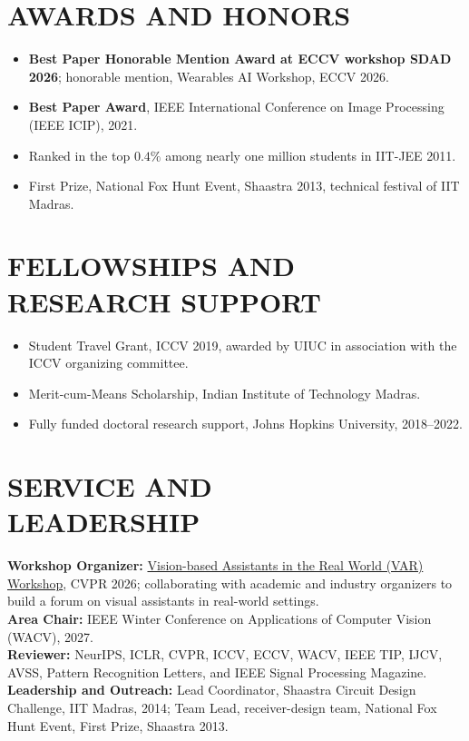 \documentclass[margin,11pt]{resume}
\begin{document}
\newpage
\section{\footnotesize {\large A}WARDS {\large A}ND {\large H}ONORS}
\begin{itemize}[leftmargin=*,itemsep=1pt,topsep=2pt]
    \item \textbf{Best Paper Honorable Mention Award at ECCV workshop SDAD 2026}; honorable mention, Wearables AI Workshop, ECCV 2026.
    \item \textbf{Best Paper Award}, IEEE International Conference on Image Processing (IEEE ICIP), 2021.
    \item Ranked in the top $0.4\%$ among nearly one million students in IIT-JEE 2011.
    \item First Prize, National Fox Hunt Event, Shaastra 2013, technical festival of IIT Madras.
\end{itemize}

\vspace{-0.8em}
\section{\footnotesize {\large F}ELLOWSHIPS {\large A}ND\\ {\large R}ESEARCH {\large S}UPPORT}
\begin{itemize}[leftmargin=*,itemsep=1pt,topsep=2pt]
    \item Student Travel Grant, ICCV 2019, awarded by UIUC in association with the ICCV organizing committee.
    \item Merit-cum-Means Scholarship, Indian Institute of Technology Madras.
    \item Fully funded doctoral research support, Johns Hopkins University, 2018--2022.
\end{itemize}

\vspace{-0.8em}
\section{\footnotesize {\large S}ERVICE {\large A}ND\\ {\large L}EADERSHIP}
\textbf{Workshop Organizer:} \href{https://varworkshop.github.io/organizers/}{Vision-based Assistants in the Real World (VAR) Workshop}, CVPR 2026; collaborating with academic and industry organizers to build a forum on visual assistants in real-world settings.\\
\textbf{Area Chair:} IEEE Winter Conference on Applications of Computer Vision (WACV), 2027.\\
\textbf{Reviewer:} NeurIPS, ICLR, CVPR, ICCV, ECCV, WACV, IEEE TIP, IJCV, AVSS, Pattern Recognition Letters, and IEEE Signal Processing Magazine.\\
\textbf{Leadership and Outreach:} Lead Coordinator, Shaastra Circuit Design Challenge, IIT Madras, 2014; Team Lead, receiver-design team, National Fox Hunt Event, First Prize, Shaastra 2013.
\end{document}
